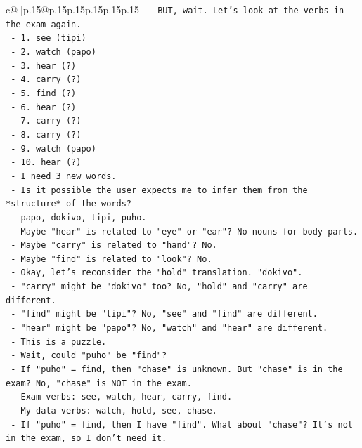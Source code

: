 \documentclass{article}
\begin{document}
{\begin{supertabular}{c@{$\;$}|p{.15\linewidth}@{}p{.15\linewidth}p{.15\linewidth}p{.15\linewidth}p{.15\linewidth}p{.15\linewidth}}
{{{\texttt{     {-} BUT, wait. Let's look at the verbs in the exam again.} \\
\texttt{     {-} 1. see (tipi)} \\
\texttt{     {-} 2. watch (papo)} \\
\texttt{     {-} 3. hear (?)} \\
\texttt{     {-} 4. carry (?)} \\
\texttt{     {-} 5. find (?)} \\
\texttt{     {-} 6. hear (?)} \\
\texttt{     {-} 7. carry (?)} \\
\texttt{     {-} 8. carry (?)} \\
\texttt{     {-} 9. watch (papo)} \\
\texttt{     {-} 10. hear (?)} \\
\texttt{     {-} I need 3 new words.} \\
\texttt{     {-} Is it possible the user expects me to infer them from the *structure* of the words?} \\
\texttt{     {-} papo, dokivo, tipi, puho.} \\
\texttt{     {-} Maybe "hear" is related to "eye" or "ear"? No nouns for body parts.} \\
\texttt{     {-} Maybe "carry" is related to "hand"? No.} \\
\texttt{     {-} Maybe "find" is related to "look"? No.} \\
\texttt{     {-} Okay, let's reconsider the "hold" translation. "dokivo".} \\
\texttt{     {-} "carry" might be "dokivo" too? No, "hold" and "carry" are different.} \\
\texttt{     {-} "find" might be "tipi"? No, "see" and "find" are different.} \\
\texttt{     {-} "hear" might be "papo"? No, "watch" and "hear" are different.} \\
\texttt{     {-} This is a puzzle.} \\
\texttt{     {-} Wait, could "puho" be "find"?} \\
\texttt{     {-} If "puho" = find, then "chase" is unknown. But "chase" is in the exam? No, "chase" is NOT in the exam.} \\
\texttt{     {-} Exam verbs: see, watch, hear, carry, find.} \\
\texttt{     {-} My data verbs: watch, hold, see, chase.} \\
\texttt{     {-} If "puho" = find, then I have "find". What about "chase"? It's not in the exam, so I don't need it.} \\
}}}
\end{supertabular}}
\end{document}
